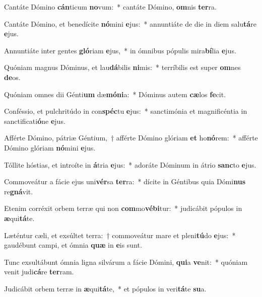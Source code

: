 \item Cantáte Dómino \textbf{cán}ticum \textbf{no}vum:~* cantáte Dómino, \textbf{om}nis \textbf{ter}ra.
\item Cantáte Dómino, et benedícite \textbf{nó}mini \textbf{e}jus:~* annuntiáte de die in diem salu\textbf{tá}re \textbf{e}jus.
\item Annuntiáte inter gentes \textbf{gló}riam \textbf{e}jus,~* in ómnibus pópulis mira\textbf{bí}lia \textbf{e}jus.
\item Quóniam magnus Dóminus, et lau\textbf{dá}bilis \textbf{ni}mis:~* terríbilis est super \textbf{om}nes \textbf{de}os.
\item Quóniam omnes dii Génti\textbf{um} dæ\textbf{mó}\textbf{ni}a:~* Dóminus autem \textbf{cæ}los \textbf{fe}cit.
\item Conféssio, et pulchritúdo in con\textbf{spéc}tu \textbf{e}jus:~* sanctimónia et magnificéntia in sanctificati\textbf{ó}ne \textbf{e}jus.
\item Afférte Dómino, pátriæ Géntium,~† afférte Dómino glóriam \textbf{et} ho\textbf{nó}rem:~* afférte Dómino glóriam \textbf{nó}mini \textbf{e}jus.
\item Tóllite hóstias, et introíte in \textbf{á}tria \textbf{e}jus:~* adoráte Dóminum in átrio \textbf{sanc}to \textbf{e}jus.
\item Commoveátur a fácie ejus uni\textbf{vér}sa \textbf{ter}ra:~* dícite in Géntibus quia Dómi\textbf{nus} re\textbf{gná}vit.
\item Etenim corréxit orbem terræ qui non \textbf{com}mo\textbf{vé}\textbf{bi}tur:~* judicábit pópulos in \textbf{æ}qui\textbf{tá}te.
\item Læténtur cæli, et exsúltet terra:~† commoveátur mare et pleni\textbf{tú}do \textbf{e}jus:~* gaudébunt campi, et ómnia \textbf{quæ} in \textbf{e}is sunt.
\item Tunc exsultábunt ómnia ligna silvárum a fácie Dómini, \textbf{qui}a \textbf{ve}nit:~* quóniam venit judi\textbf{cá}re \textbf{ter}ram.
\item Judicábit orbem terræ in \textbf{æ}qui\textbf{tá}te,~* et pópulos in veri\textbf{tá}te \textbf{su}a.

